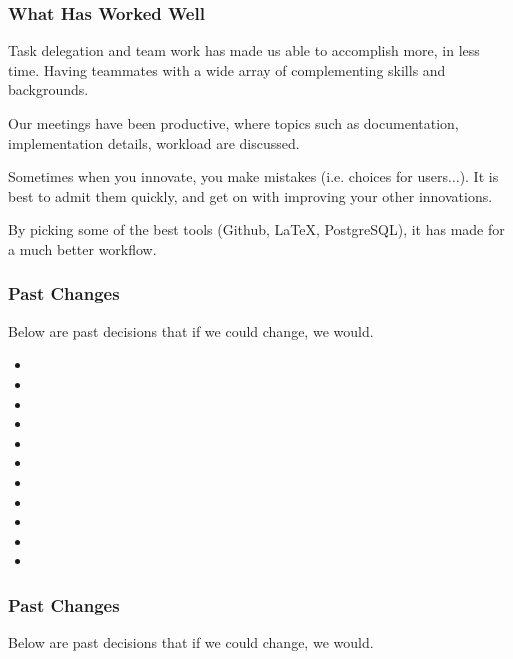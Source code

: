 \documentclass{beamer}
\newcounter{tools}
\begin{document}
\begin{frame}
    \frametitle{What Has Worked Well}

    \begin{description}[<+->]
        \item[Teamwork] Task delegation and team work has made us able to accomplish more, in less time. Having teammates with a wide array of complementing skills and backgrounds.
        \item[Meetings] Our meetings have been productive, where topics such as documentation, implementation details, workload are discussed.
        \item[Changes] Sometimes when you innovate, you make mistakes (i.e. choices for users$\ldots$). It is best to admit them quickly, and get on with improving your other innovations. %
        \item[Tools] By picking some of the best tools (Github, \LaTeX{}, PostgreSQL), it has made for a much better workflow.
    \end{description}
\end{frame}


\begin{frame}
    \frametitle{Past Changes}
    Below are past decisions that if we could change, we would. \pause

    \begin{itemize}
        \item
        \item
        \item
        \item
        \item
        \item
        \item
        \item
        \item
        \item
        \item
    \end{itemize}
\end{frame}

\begin{frame}
    \frametitle{Past Changes}
    Below are past decisions that if we could change, we would.

    \centering
\end{frame}
\end{document}
